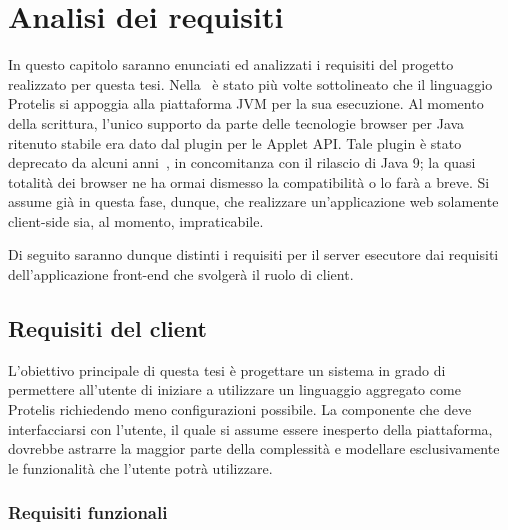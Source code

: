 \chapter{Analisi dei requisiti}\label{ch:requirements}
  In questo capitolo saranno enunciati ed analizzati i requisiti del progetto realizzato per questa tesi.
  Nella~ è stato più volte sottolineato che il linguaggio Protelis si appoggia alla piattaforma JVM per la sua esecuzione.
  Al momento della scrittura, l'unico supporto da parte delle tecnologie browser per Java ritenuto stabile era dato dal plugin per le Applet API\@.
  Tale plugin è stato deprecato da alcuni anni~\cite{jep289}, in concomitanza con il rilascio di Java 9;
  la quasi totalità dei browser ne ha ormai dismesso la compatibilità o lo farà a breve.
  Si assume già in questa fase, dunque, che realizzare un'applicazione web solamente client-side sia, al momento, impraticabile.

  Di seguito saranno dunque distinti i requisiti per il server esecutore dai requisiti dell'applicazione front-end che svolgerà il ruolo di client.

  \section{Requisiti del client}
    L'obiettivo principale di questa tesi è progettare un sistema in grado di permettere all'utente di iniziare a utilizzare un linguaggio aggregato come Protelis richiedendo meno configurazioni possibile.
    La componente che deve interfacciarsi con l'utente, il quale si assume essere inesperto della piattaforma, dovrebbe astrarre la maggior parte della complessità e modellare esclusivamente le funzionalità che l'utente potrà utilizzare.

    \subsection{Requisiti funzionali}

